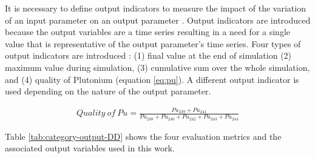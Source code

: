 It is necessary to define output indicators to measure the 
impact of the variation of an input parameter on an output 
parameter \cite{noauthor_effects_2017}. 
Output indicators are introduced because the output variables
are a time series resulting in a need for a single value that 
is representative of the output parameter's time series.  
Four types of output indicators are introduced 
\cite{noauthor_effects_2017}: 
(1) final value at the end of simulation
(2) maximum value during simulation,  
(3) cumulative sum over the whole simulation, and 
(4) quality of Plutonium (equation \ref{eq:pu}). 
A different output indicator is used depending on 
the nature of the output parameter.

\begin{align}
    \label{eq:pu}
Quality\ of\ Pu = \frac{Pu_{239}+Pu_{241}}{Pu_{238}+Pu_{240}+Pu_{242}+Pu_{243}+Pu_{244}}
\end{align}

Table \ref{tab:category-output-DD} shows the four evaluation 
metrics and the associated output variables used in this work. 

